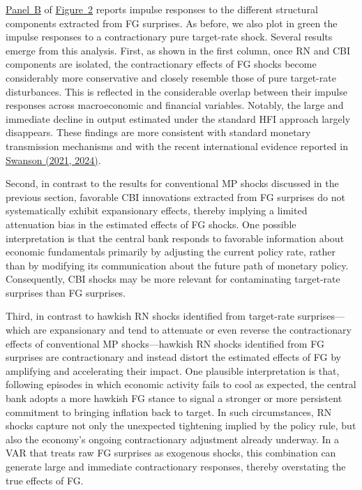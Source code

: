 \documentclass[\latexroot/\projectname]{subfiles}
\begin{document}
\hyperlink{Panel BF1}{Panel~B} of \hyperlink{Figure~2}{Figure~2} reports impulse responses to the different structural components extracted from FG surprises. As before, we also plot in green the impulse responses to a contractionary pure target-rate shock. Several results emerge from this analysis. First, as shown in the first column, once RN and CBI components are isolated, the contractionary effects of FG shocks become considerably more conservative and closely resemble those of pure target-rate disturbances. This is reflected in the considerable overlap between their impulse responses across macroeconomic and financial variables. Notably, the large and immediate decline in output estimated under the standard HFI approach largely disappears. These findings are more consistent with standard monetary transmission mechanisms and with the recent international evidence reported in \hyperlink{Swanson (2021, 2024)}{Swanson (2021, 2024)}.

Second, in contrast to the results for conventional MP shocks discussed in the previous section, favorable CBI innovations extracted from FG surprises do not systematically exhibit expansionary effects, thereby implying a limited attenuation bias in the estimated effects of FG shocks. One possible interpretation is that the central bank responds to favorable information about economic fundamentals primarily by adjusting the current policy rate, rather than by modifying its communication about the future path of monetary policy.  Consequently, CBI shocks may be more relevant for contaminating target-rate surprises than FG surprises. 

Third, in contrast to hawkish RN shocks identified from target-rate surprises—which are expansionary and tend to attenuate or even reverse the contractionary effects of conventional MP shocks—hawkish RN shocks identified from FG surprises are contractionary and instead distort the estimated effects of FG by amplifying and accelerating their impact. One plausible interpretation is that, following episodes in which economic activity fails to cool as expected, the central bank adopts a more hawkish FG stance to signal a stronger or more persistent commitment to bringing inflation back to target. In such circumstances, RN shocks capture not only the unexpected tightening implied by the policy rule, but also the economy’s ongoing contractionary adjustment already underway. In a VAR that treats raw FG surprises as exogenous shocks, this combination can generate large and immediate contractionary responses, thereby overstating the true effects of FG.
\end{document}
